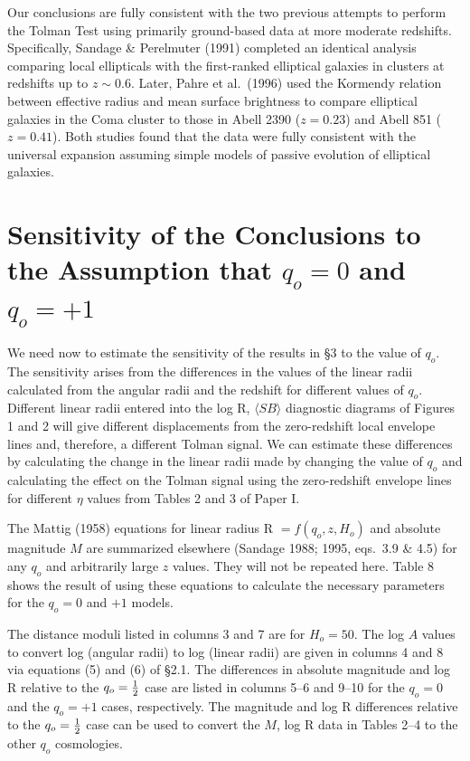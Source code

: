 \documentclass[preprint]{aastex}
\begin{document}
Our conclusions are fully consistent with the two previous attempts to
perform the Tolman Test using primarily ground-based data at more
moderate redshifts. Specifically, Sandage \& Perelmuter (1991)
completed an identical analysis comparing local ellipticals with the
first-ranked elliptical galaxies in clusters at redshifts up to $z
\sim 0.6$. Later, Pahre et al.\ (1996) used the Kormendy relation
between effective radius and mean surface brightness to compare
elliptical galaxies in the Coma cluster to those in Abell 2390 ($z =
0.23$) and Abell 851 ($z = 0.41$). Both studies found that the data
were fully consistent with the universal expansion assuming simple
models of passive evolution of elliptical galaxies.

\section{Sensitivity of the Conclusions to the Assumption that $q_o = 0$
and $q_o = +1$}

We need now to estimate the sensitivity of the results in \S 3 to the
value of $q_o$. The sensitivity arises from the differences in the
values of the linear radii calculated from the angular radii and the
redshift for different values of $q_o$.  Different linear radii
entered into the log R, $\langle SB \rangle$ diagnostic diagrams of
Figures 1 and 2 will give different displacements from the
zero-redshift local envelope lines and, therefore, a different Tolman
signal. We can estimate these differences by calculating the change in
the linear radii made by changing the value of $q_o$ and calculating
the effect on the Tolman signal using the zero-redshift envelope lines
for different $\eta$ values from Tables 2 and 3 of Paper I.

The Mattig (1958) equations for linear radius R $= f(q_o,z,H_o)$ and
absolute magnitude $M$ are summarized elsewhere (Sandage 1988; 1995,
eqs.\ 3.9 \& 4.5) for any $q_o$ and arbitrarily large $z$ values.
They will not be repeated here. Table 8 shows the result of using
these equations to calculate the necessary parameters for the $q_o =
0$ and $+1$ models.

The distance moduli listed in columns 3 and 7 are for $H_o = 50$. The
log $A$ values to convert log (angular radii) to log (linear radii)
are given in columns 4 and 8 via equations (5) and (6) of \S 2.1. The
differences in absolute magnitude and log R relative to the $q_o =
{1\over{2}}$ case are listed in columns 5--6 and 9--10 for the $q_o =
0$ and the $q_o = +1$ cases, respectively. The magnitude and log R
differences relative to the $q_o = {1\over{2}}$ case can be used to
convert the $M$, log R data in Tables 2--4 to the other $q_o$
cosmologies.
\end{document}
